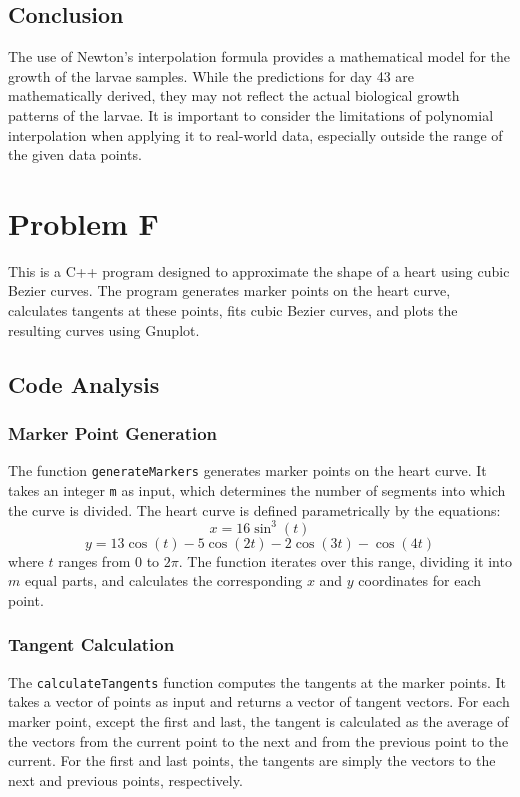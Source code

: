 \documentclass{article}
\begin{document}
\subsection{Conclusion}
The use of Newton's interpolation formula provides a mathematical model for the growth of the larvae samples. While the predictions for day 43 are mathematically derived, they may not reflect the actual biological growth patterns of the larvae. It is important to consider the limitations of polynomial interpolation when applying it to real-world data, especially outside the range of the given data points.



\section{Problem F}
This is a C++ program designed to approximate the shape of a heart using cubic Bezier curves. The program generates marker points on the heart curve, calculates tangents at these points, fits cubic Bezier curves, and plots the resulting curves using Gnuplot.

\subsection{Code Analysis}

\subsubsection{Marker Point Generation}
The function \texttt{generateMarkers} generates marker points on the heart curve. It takes an integer \texttt{m} as input, which determines the number of segments into which the curve is divided. The heart curve is defined parametrically by the equations:
\[ x = 16 \sin^3(t) \]
\[ y = 13 \cos(t) - 5 \cos(2t) - 2 \cos(3t) - \cos(4t) \]
where \(t\) ranges from \(0\) to \(2\pi\). The function iterates over this range, dividing it into \(m\) equal parts, and calculates the corresponding \(x\) and \(y\) coordinates for each point.

\subsubsection{Tangent Calculation}
The \texttt{calculateTangents} function computes the tangents at the marker points. It takes a vector of points as input and returns a vector of tangent vectors. For each marker point, except the first and last, the tangent is calculated as the average of the vectors from the current point to the next and from the previous point to the current. For the first and last points, the tangents are simply the vectors to the next and previous points, respectively.
\end{document}

